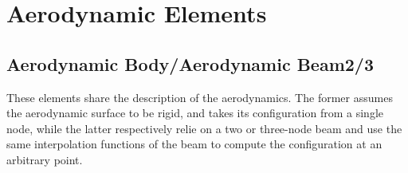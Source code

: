 %
%
%
%
%
% 
%
%

\section{Aerodynamic Elements}
\label{sec:EL:AERO}


\subsection{Aerodynamic Body/Aerodynamic Beam2/3}
\label{sec:EL:AERO:BODY-BEAM23}
These elements share the description of the aerodynamics.
The former assumes the aerodynamic surface to be rigid,
and takes its configuration from a single node, while the latter
respectively relie on a two or three-node beam
and use the same interpolation functions of the beam to compute
the configuration at an arbitrary point.

